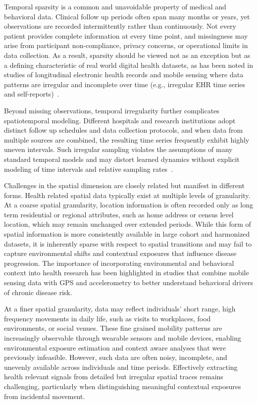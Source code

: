 \documentclass[acmsmall]{acmart}
\begin{document}
Temporal sparsity is a common and unavoidable property of medical and behavioral data. Clinical follow up periods often span many months or years, yet observations are recorded intermittently rather than continuously. Not every patient provides complete information at every time point, and missingness may arise from participant non-compliance, privacy concerns, or operational limits in data collection. As a result, sparsity should be viewed not as an exception but as a defining characteristic of real world digital health datasets, as has been noted in studies of longitudinal electronic health records and mobile sensing where data patterns are irregular and incomplete over time (e.g., irregular EHR time series and self-reports)~\cite{che2018grud}.

Beyond missing observations, temporal irregularity further complicates spatiotemporal modeling. Different hospitals and research institutions adopt distinct follow up schedules and data collection protocols, and when data from multiple sources are combined, the resulting time series frequently exhibit highly uneven intervals. Such irregular sampling violates the assumptions of many standard temporal models and may distort learned dynamics without explicit modeling of time intervals and relative sampling rates~\cite{shukla2021irregular}.

Challenges in the spatial dimension are closely related but manifest in different forms. Health related spatial data typically exist at multiple levels of granularity. At a coarse spatial granularity, location information is often recorded only as long term residential or regional attributes, such as home address or census level location, which may remain unchanged over extended periods. While this form of spatial information is more consistently available in large cohort and harmonized datasets, it is inherently sparse with respect to spatial transitions and may fail to capture environmental shifts and contextual exposures that influence disease progression. The importance of incorporating environmental and behavioral context into health research has been highlighted in studies that combine mobile sensing data with GPS and accelerometry to better understand behavioral drivers of chronic disease risk.

At a finer spatial granularity, data may reflect individuals’ short range, high frequency movements in daily life, such as visits to workplaces, food environments, or social venues. These fine grained mobility patterns are increasingly observable through wearable sensors and mobile devices, enabling environmental exposure estimation and context aware analyses that were previously infeasible. However, such data are often noisy, incomplete, and unevenly available across individuals and time periods. Effectively extracting health relevant signals from detailed but irregular spatial traces remains challenging, particularly when distinguishing meaningful contextual exposures from incidental movement.
\end{document}
